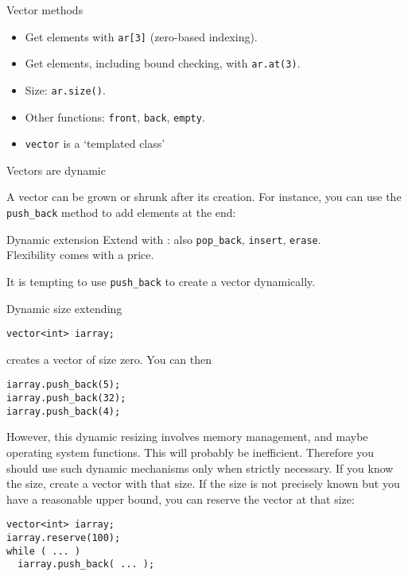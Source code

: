 \begin{slide}{Vector methods}
  \label{sl:vector-method}
  \begin{itemize}
  \item Get elements with \lstinline{ar[3]} (zero-based indexing).
  \item Get elements, including bound checking, with \lstinline{ar.at(3)}.
  \item Size: \lstinline{ar.size()}.
  \item Other functions: \lstinline{front}, \lstinline{back}, \lstinline{empty}.
  \item \lstinline{vector} is a `templated class'
  \end{itemize}
\end{slide}

 {Vectors are dynamic}
\label{sec:stdvector-dynamic}

A vector
can be grown or shrunk after its creation.
For instance, you can use the \lstinline{push_back} method to add elements at the end:

\begin{block}{Dynamic extension}
  \label{sl:vector-dynamic}
  Extend with :
  also \lstinline{pop_back}, \lstinline{insert}, \lstinline{erase}.\\
  Flexibility comes with a price.
\end{block}

It is tempting to use \lstinline{push_back} to create a vector dynamically.

\begin{block}{Dynamic size extending}
  \label{sl:vector-extend}
\begin{lstlisting}
vector<int> iarray;
\end{lstlisting}
creates a vector of size zero. You can then
\begin{lstlisting}
iarray.push_back(5);
iarray.push_back(32);
iarray.push_back(4);
\end{lstlisting}
\end{block}

However, this dynamic resizing involves memory management, and maybe
operating system functions. This will probably be
inefficient. Therefore you should use such dynamic mechanisms only
when strictly necessary.
If you know the size,
create a vector with that size. If the size is not precisely known but
you have a reasonable upper bound, you can 
reserve the vector at that size:
\begin{lstlisting}
vector<int> iarray;
iarray.reserve(100);
while ( ... )
  iarray.push_back( ... );
\end{lstlisting}

